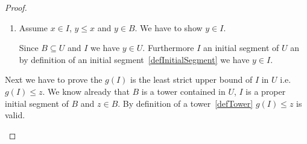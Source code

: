 \begin{lemma}
\begin{proof}
\begin{enumerate}
\begin{enumerate}
                        In the first case $x \in B$ is trivially valid.

                        If $B$ is an initial segment of $C$ then $z \in C$ is
                        valid. Since $x < z$ the element $x$ has to be in $B$.

                    \item Assume $x \in I$, $y \le x$ and $y \in B$. We have to
                        show $y \in I$.

                        Since $B \subseteq U$ and $I$ we have $y \in U$.
                        Furthermore $I$ an initial segment of $U$ an by
                        definition of an initial segment~\ref{defInitialSegment}
                        we have $y \in I$.
                \end{enumerate}

                Next we have to prove the $g(I)$ is the least strict upper bound
                of $I$ in $U$ i.e. $g(I) \le z$. We know already that $B$ is a
                tower contained in $U$, $I$ is a proper initial segment of $B$
                and $z \in B$. By definition of a tower~\ref{defTower} $g(I) \le
                z$ is valid.
        \end{enumerate}
    \end{proof}
\end{lemma}




